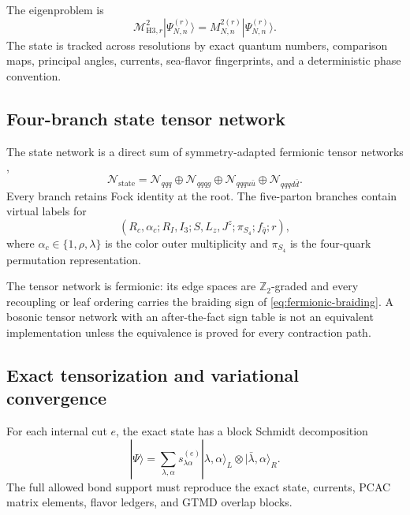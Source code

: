 \documentclass[11pt]{article}
\newcommand{\cM}{\mathcal M}
\newcommand{\cN}{\mathcal N}
\newcommand{\Lz}{L_z}
\newcommand{\Jz}{J^z}
\begin{document}
The eigenproblem is
\begin{equation}
 \cM_{\mathrm{H3},r}^{2}
 |\Psi_{N,n}^{(r)}\rangle
 =M_{N,n}^{2(r)}|\Psi_{N,n}^{(r)}\rangle.
\end{equation}
The state is tracked across resolutions by exact quantum numbers, comparison
maps, principal angles, currents, sea-flavor fingerprints, and a deterministic
phase convention.

\subsection{Four-branch state tensor network}

The state network is a direct sum of symmetry-adapted fermionic tensor
networks \cite{Singh2010,Corboz2010},
\begin{equation}
 \cN_{\mathrm{state}}
 =
 \cN_{qqq}
 \oplus\cN_{qqqg}
 \oplus\cN_{qqqu\bar u}
 \oplus\cN_{qqqd\bar d}.
 \label{eq:h3-ttn}
\end{equation}
Every branch retains Fock identity at the root.  The five-parton branches
contain virtual labels for
\begin{equation}
 \left(
 R_c,\alpha_c;
 R_I,I_3;
 S,\Lz,\Jz;
 \pi_{S_4};
 f_{\bar q};
 r
 \right),
\end{equation}
where \(\alpha_c\in\{1,\rho,\lambda\}\) is the color outer multiplicity and
\(\pi_{S_4}\) is the four-quark permutation representation.

The tensor network is fermionic: its edge spaces are \(\mathbb Z_2\)-graded
and every recoupling or leaf ordering carries the braiding sign of
\cref{eq:fermionic-braiding}.  A bosonic tensor network with an after-the-fact
sign table is not an equivalent implementation unless the equivalence is
proved for every contraction path.

\subsection{Exact tensorization and variational convergence}

For each internal cut \(e\), the exact state has a block Schmidt
decomposition
\begin{equation}
 |\Psi\rangle
 =
 \sum_{\lambda,\alpha}
 s_{\lambda\alpha}^{(e)}
 |\lambda,\alpha\rangle_L
 \otimes
 |\bar\lambda,\alpha\rangle_R.
\end{equation}
The full allowed bond support must reproduce the exact state, currents,
PCAC matrix elements, flavor ledgers, and GTMD overlap blocks.
\end{document}
